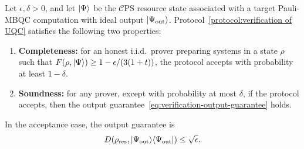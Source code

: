 \documentclass[a4paper,twocolumn,11pt,unpublished]{../../revision/quantumarticle}
\newcommand{\mCEPS}{\mathcal{C}\text{PS}}
\newcommand{\ketbra}[1]{\ket{#1}\!\bra{#1}}
\begin{document}
\begin{theorem}
    Let $\epsilon,\delta>0$, and let $\ket{\Psi}$ be the $\mCEPS$ resource state associated with a target Pauli-MBQC computation with ideal output $\ket{\Psi_{\rm out}}$. Protocol~\ref{protocol:verification of UQC} satisfies the following two properties:
    \begin{enumerate}
        \item \textbf{Completeness:} for an honest i.i.d.\ prover preparing systems in a state $\rho$ such that $F(\rho,\ket{\Psi})\geq 1-\epsilon/(3(1+t))$, the protocol accepts with probability at least $1-\delta$.

        \item \textbf{Soundness:} for any prover, except with probability at most $\delta$, if the protocol accepts, then the output guarantee~\eqref{eq:verification-output-guarantee} holds.
    \end{enumerate}
    In the acceptance case, the output guarantee is
    \begin{equation}
        \label{eq:verification-output-guarantee}
        D(\rho_{\mathrm{res}},\ketbra{\Psi_{\rm out}})\leq \sqrt{\epsilon}.
    \end{equation}
\end{theorem}
\end{document}

